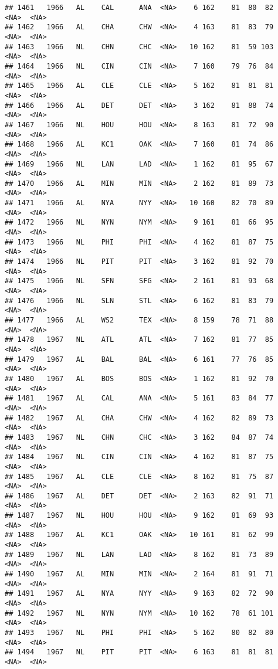 \documentclass[]{article}
\begin{document}
\begin{verbatim}
## 1461   1966   AL    CAL      ANA  <NA>    6 162    81  80  82   <NA>  <NA>
## 1462   1966   AL    CHA      CHW  <NA>    4 163    81  83  79   <NA>  <NA>
## 1463   1966   NL    CHN      CHC  <NA>   10 162    81  59 103   <NA>  <NA>
## 1464   1966   NL    CIN      CIN  <NA>    7 160    79  76  84   <NA>  <NA>
## 1465   1966   AL    CLE      CLE  <NA>    5 162    81  81  81   <NA>  <NA>
## 1466   1966   AL    DET      DET  <NA>    3 162    81  88  74   <NA>  <NA>
## 1467   1966   NL    HOU      HOU  <NA>    8 163    81  72  90   <NA>  <NA>
## 1468   1966   AL    KC1      OAK  <NA>    7 160    81  74  86   <NA>  <NA>
## 1469   1966   NL    LAN      LAD  <NA>    1 162    81  95  67   <NA>  <NA>
## 1470   1966   AL    MIN      MIN  <NA>    2 162    81  89  73   <NA>  <NA>
## 1471   1966   AL    NYA      NYY  <NA>   10 160    82  70  89   <NA>  <NA>
## 1472   1966   NL    NYN      NYM  <NA>    9 161    81  66  95   <NA>  <NA>
## 1473   1966   NL    PHI      PHI  <NA>    4 162    81  87  75   <NA>  <NA>
## 1474   1966   NL    PIT      PIT  <NA>    3 162    81  92  70   <NA>  <NA>
## 1475   1966   NL    SFN      SFG  <NA>    2 161    81  93  68   <NA>  <NA>
## 1476   1966   NL    SLN      STL  <NA>    6 162    81  83  79   <NA>  <NA>
## 1477   1966   AL    WS2      TEX  <NA>    8 159    78  71  88   <NA>  <NA>
## 1478   1967   NL    ATL      ATL  <NA>    7 162    81  77  85   <NA>  <NA>
## 1479   1967   AL    BAL      BAL  <NA>    6 161    77  76  85   <NA>  <NA>
## 1480   1967   AL    BOS      BOS  <NA>    1 162    81  92  70   <NA>  <NA>
## 1481   1967   AL    CAL      ANA  <NA>    5 161    83  84  77   <NA>  <NA>
## 1482   1967   AL    CHA      CHW  <NA>    4 162    82  89  73   <NA>  <NA>
## 1483   1967   NL    CHN      CHC  <NA>    3 162    84  87  74   <NA>  <NA>
## 1484   1967   NL    CIN      CIN  <NA>    4 162    81  87  75   <NA>  <NA>
## 1485   1967   AL    CLE      CLE  <NA>    8 162    81  75  87   <NA>  <NA>
## 1486   1967   AL    DET      DET  <NA>    2 163    82  91  71   <NA>  <NA>
## 1487   1967   NL    HOU      HOU  <NA>    9 162    81  69  93   <NA>  <NA>
## 1488   1967   AL    KC1      OAK  <NA>   10 161    81  62  99   <NA>  <NA>
## 1489   1967   NL    LAN      LAD  <NA>    8 162    81  73  89   <NA>  <NA>
## 1490   1967   AL    MIN      MIN  <NA>    2 164    81  91  71   <NA>  <NA>
## 1491   1967   AL    NYA      NYY  <NA>    9 163    82  72  90   <NA>  <NA>
## 1492   1967   NL    NYN      NYM  <NA>   10 162    78  61 101   <NA>  <NA>
## 1493   1967   NL    PHI      PHI  <NA>    5 162    80  82  80   <NA>  <NA>
## 1494   1967   NL    PIT      PIT  <NA>    6 163    81  81  81   <NA>  <NA>

\end{verbatim}
\end{document}
